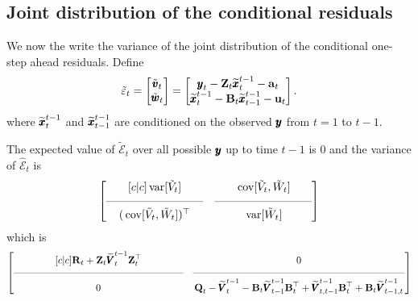 \documentclass[]{article}
\def\UPS{\mbox{\boldmath $\Upsilon$}}
\def\XI{\mbox{\boldmath $\Xi$}}
\def\BB{\mbox{$\mathbf B$}}	\def\bb{\mbox{$\mathbf b$}} \def\Bb{\mbox{$\mathbf J$}} \def\Ba{\mbox{$\mathbf L$}} \def\Bm{\UPS}
\def\QQ{\mbox{$\mathbf Q$}}	 \def\qq{\mbox{$\mathbf q$}} \def\Qb{\mbox{$\mathbf G$}}  \def\Qm{\mathbb{Q}}
\def\RR{\mbox{$\mathbf R$}}	 \def\rr{\mbox{$\mathbf r$}} \def\Rb{\mbox{$\mathbf H$}}	\def\Rm{\mathbb{R}}
\def\VV{\mbox{$\pmb{V}$}}	\def\vv{\mbox{$\pmb{v}$}}
\def\ZZ{\mbox{$\mathbf Z$}}	\def\zz{\mbox{$\mathbf z$}}	\def\Zb{\mbox{$\mathbf M$}} \def\Za{\mbox{$\mathbf N$}} \def\Zm{\XI}
\def\var{\,\textup{\textrm{var}}}
\def\cov{\,\textup{\textrm{cov}}}
\def\hatxtt1{\widetilde{\xx}_t^{t-1}}
\def\hatxtmt1{\widetilde{\mbox{$\xx$}}_{t-1}^{t-1}}
\def\hatVtt1{\widetilde{\VV}_t^{t-1}}
\def\hatVtmt1{\widetilde{\VV}_{t-1}^{t-1}}
\def\hatVttmt1{\widetilde{\VV}_{t,t-1}^{t-1}}
\begin{document}
\subsection{Joint distribution of the conditional residuals}

We now the write the variance of the joint distribution of the conditional one-step ahead residuals. Define
\begin{equation}
\tilde{\varepsilon}_t = \begin{bmatrix}\tilde{\vv}_t\\ \tilde{\ww}_t\end{bmatrix} =
\begin{bmatrix}\yy_t - \ZZ_t\hatxtt1-\aa_t\\ \hatxtt1 - \BB_t\hatxtmt1-\uu_t \end{bmatrix}.
\end{equation}
where $\hatxtt1$ and $\hatxtmt1$ are conditioned on the observed $\mbox{$\pmb{y}$}$ from $t=1$ to $t-1$.

The expected value of $\tilde{\mathcal{E}}_t$ over all possible $\mbox{$\pmb{y}$}$ up to time $t-1$ is 0 and the variance of $\hat{\mathcal{E}}_t$  is
\begin{equation}
 \begin{bmatrix}[c|c]
 \var[\tilde{V}_t]&
 \cov[\tilde{V}_t, \tilde{W}_t] \\
 \rule[.5ex]{20ex}{0.25pt} & \rule[.5ex]{20ex}{0.25pt} \\
 (\cov[\tilde{V}_t, \tilde{W}_t])^\top& 
 \var[\tilde{W}_t] \end{bmatrix}
\end{equation}
which is
\begin{equation}\label{eqn:jointcondresid1innovs}
 \begin{bmatrix}[c|c]
 \RR_t + \ZZ_t \hatVtt1 \ZZ_t^\top& 0 \\
 \rule[.5ex]{40ex}{0.25pt} & \rule[.5ex]{50ex}{0.25pt} \\
 0 & \QQ_t - \hatVtt1 - \BB_t \hatVtmt1 \BB_t^\top + \hatVttmt1 \BB_t^\top + \BB_t\widetilde{\VV}_{t-1,t}^{t-1} \end{bmatrix}
\end{equation}
\end{document}
